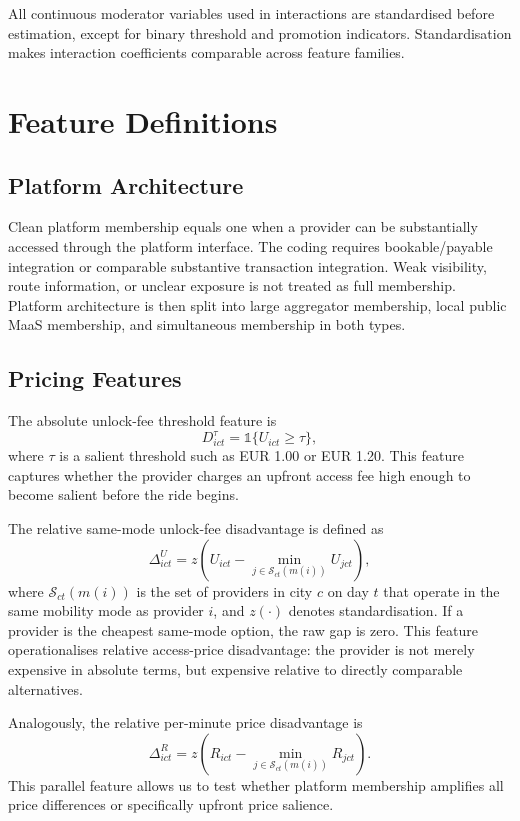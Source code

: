 \documentclass[11pt]{article}
\begin{document}
All continuous moderator variables used in interactions are standardised before estimation,
except for binary threshold and promotion indicators. Standardisation makes interaction
coefficients comparable across feature families.

\section{Feature Definitions}

\subsection{Platform Architecture}

Clean platform membership equals one when a provider can be substantially accessed through
the platform interface. The coding requires bookable/payable integration or comparable
substantive transaction integration. Weak visibility, route information, or unclear exposure
is not treated as full membership. Platform architecture is then split into large aggregator
membership, local public MaaS membership, and simultaneous membership in both types.

\subsection{Pricing Features}

The absolute unlock-fee threshold feature is
\[
D^{\tau}_{ict}=\mathbb{1}\{U_{ict}\geq \tau\},
\]
where $\tau$ is a salient threshold such as EUR 1.00 or EUR 1.20. This feature captures
whether the provider charges an upfront access fee high enough to become salient before
the ride begins.

The relative same-mode unlock-fee disadvantage is defined as
\[
\Delta^{U}_{ict}=z\left(U_{ict}-\min_{j\in \mathcal{S}_{ct}(m(i))} U_{jct}\right),
\]
where $\mathcal{S}_{ct}(m(i))$ is the set of providers in city $c$ on day $t$ that operate
in the same mobility mode as provider $i$, and $z(\cdot)$ denotes standardisation. If a
provider is the cheapest same-mode option, the raw gap is zero. This feature operationalises
relative access-price disadvantage: the provider is not merely expensive in absolute terms,
but expensive relative to directly comparable alternatives.

Analogously, the relative per-minute price disadvantage is
\[
\Delta^{R}_{ict}=z\left(R_{ict}-\min_{j\in \mathcal{S}_{ct}(m(i))} R_{jct}\right).
\]
This parallel feature allows us to test whether platform membership amplifies all price
differences or specifically upfront price salience.
\end{document}

